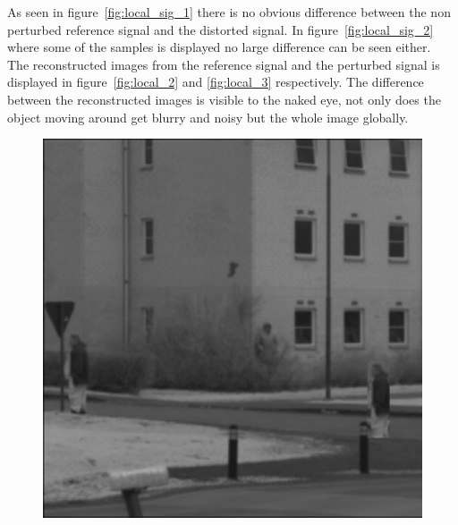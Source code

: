 As seen in figure~\ref{fig:local_sig_1} there is no obvious difference between the non perturbed reference signal and the distorted signal. In figure~\ref{fig:local_sig_2} where some of the samples is displayed no large difference can be seen either.\\[0.1in]

The reconstructed images from the reference signal and the perturbed signal is displayed in figure~\ref{fig:local_2} and \ref{fig:local_3} respectively. The difference between the reconstructed images is visible to the naked eye, not only does the object moving around get blurry and noisy but the whole image globally.


\begin{figure}[H]
    \centering
\begin{minipage}[t]{0.32\textwidth}
    \includegraphics[width=1\textwidth]{result/dynamic/local/local_whole_time_org.png}
    \subcaption{}
    \label{fig:local_1}
\end{minipage}
\begin{minipage}[t]{0.32\textwidth}

\end{minipage}
\end{figure}

